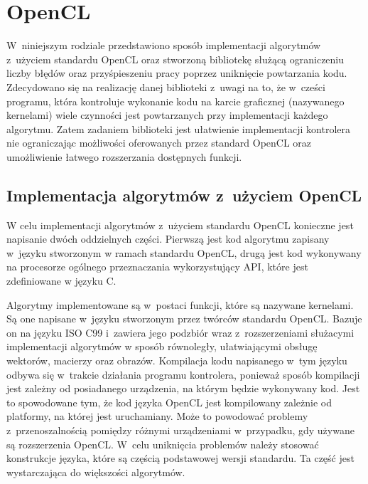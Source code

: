 \chapter{OpenCL}
\label{cha:opencl}

W~niniejszym rodziale przedstawiono sposób implementacji algorytmów z~użyciem standardu OpenCL oraz stworzoną bibliotekę służącą ograniczeniu liczby błędów oraz przyśpieszeniu pracy poprzez uniknięcie powtarzania kodu. Zdecydowano się na realizację danej biblioteki z~uwagi na to, że w~cześci programu, która kontroluje wykonanie kodu na karcie graficznej (nazywanego kernelami) wiele czynności jest powtarzanych przy implementacji każdego algorytmu. Zatem zadaniem biblioteki jest ułatwienie implementacji kontrolera nie ograniczając możliwości oferowanych przez standard OpenCL oraz umożliwienie łatwego rozszerzania dostępnych funkcji.

\section{Implementacja algorytmów z~użyciem OpenCL}  
\label{sec:szczegolyOpenCL}

W celu implementacji algorytmów z~użyciem standardu OpenCL konieczne jest napisanie dwóch oddzielnych części. Pierwszą jest kod algorytmu zapisany w~języku stworzonym w ramach standardu OpenCL, drugą jest kod wykonywany na procesorze ogólnego przeznaczania wykorzystujący API, które jest zdefiniowane w języku C.

Algorytmy implementowane są w~postaci funkcji, które są nazywane kernelami. Są one napisane w~języku stworzonym przez twórców standardu OpenCL. Bazuje on na języku ISO C99 i~zawiera jego podzbiór wraz z~rozszerzeniami służacymi implementacji algorytmów w sposób równoległy, ułatwiającymi obsługę wektorów, macierzy oraz obrazów. Kompilacja kodu napisanego w~tym języku odbywa się w~trakcie działania programu kontrolera, ponieważ sposób kompilacji jest zależny od posiadanego urządzenia, na którym będzie wykonywany kod. Jest to spowodowane tym, że kod języka OpenCL jest kompilowany zależnie od platformy, na której jest uruchamiany. Może to powodować problemy z~przenoszalnością pomiędzy różnymi urządzeniami w~przypadku, gdy używane są rozszerzenia OpenCL. W~celu uniknięcia problemów należy stosować konstrukcje języka, które są częścią podstawowej wersji standardu. Ta część jest wystarczająca do większości algorytmów.

